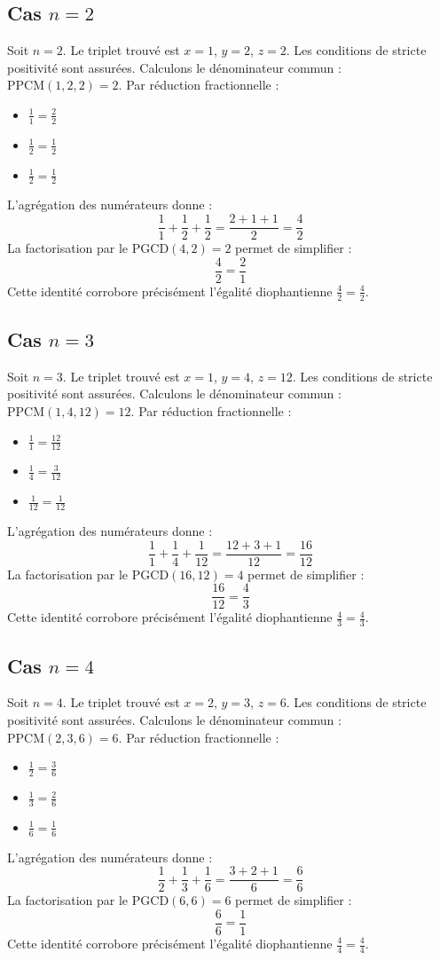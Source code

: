 \documentclass[11pt,a4paper]{article}
\begin{document}
\subsection{Cas $n = 2$}
Soit $n = 2$. Le triplet trouvé est $x = 1$, $y = 2$, $z = 2$.
Les conditions de stricte positivité sont assurées.
Calculons le dénominateur commun : $\text{PPCM}(1, 2, 2) = 2$.
Par réduction fractionnelle :
\begin{itemize}
    \item $\frac{1}{1} = \frac{2}{2}$
    \item $\frac{1}{2} = \frac{1}{2}$
    \item $\frac{1}{2} = \frac{1}{2}$
\end{itemize}
L'agrégation des numérateurs donne :
$$ \frac{1}{1} + \frac{1}{2} + \frac{1}{2} = \frac{2 + 1 + 1}{2} = \frac{4}{2} $$
La factorisation par le $\text{PGCD}(4, 2) = 2$ permet de simplifier :
$$ \frac{4}{2} = \frac{2}{1} $$
Cette identité corrobore précisément l'égalité diophantienne $\frac{4}{2} = \frac{4}{2}$.

\subsection{Cas $n = 3$}
Soit $n = 3$. Le triplet trouvé est $x = 1$, $y = 4$, $z = 12$.
Les conditions de stricte positivité sont assurées.
Calculons le dénominateur commun : $\text{PPCM}(1, 4, 12) = 12$.
Par réduction fractionnelle :
\begin{itemize}
    \item $\frac{1}{1} = \frac{12}{12}$
    \item $\frac{1}{4} = \frac{3}{12}$
    \item $\frac{1}{12} = \frac{1}{12}$
\end{itemize}
L'agrégation des numérateurs donne :
$$ \frac{1}{1} + \frac{1}{4} + \frac{1}{12} = \frac{12 + 3 + 1}{12} = \frac{16}{12} $$
La factorisation par le $\text{PGCD}(16, 12) = 4$ permet de simplifier :
$$ \frac{16}{12} = \frac{4}{3} $$
Cette identité corrobore précisément l'égalité diophantienne $\frac{4}{3} = \frac{4}{3}$.

\subsection{Cas $n = 4$}
Soit $n = 4$. Le triplet trouvé est $x = 2$, $y = 3$, $z = 6$.
Les conditions de stricte positivité sont assurées.
Calculons le dénominateur commun : $\text{PPCM}(2, 3, 6) = 6$.
Par réduction fractionnelle :
\begin{itemize}
    \item $\frac{1}{2} = \frac{3}{6}$
    \item $\frac{1}{3} = \frac{2}{6}$
    \item $\frac{1}{6} = \frac{1}{6}$
\end{itemize}
L'agrégation des numérateurs donne :
$$ \frac{1}{2} + \frac{1}{3} + \frac{1}{6} = \frac{3 + 2 + 1}{6} = \frac{6}{6} $$
La factorisation par le $\text{PGCD}(6, 6) = 6$ permet de simplifier :
$$ \frac{6}{6} = \frac{1}{1} $$
Cette identité corrobore précisément l'égalité diophantienne $\frac{4}{4} = \frac{4}{4}$.
\end{document}

